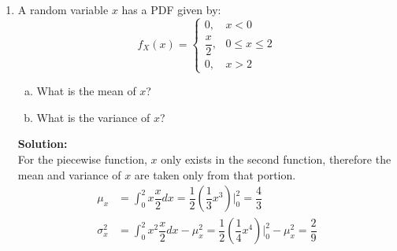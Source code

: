 \documentclass[11pt]{article}
\newcommand{\solution}{\textbf{Solution: \\}}
\begin{document}
\begin{enumerate}[label=\textbf{\arabic*.}]
  \item A random variable $x$ has a PDF given by:
  \[ f_X(x) = 
  \begin{cases}
    \mbox{$0$,           } & \mbox{} x<0 \\
    \mbox{$\dfrac{x}{2}$,} & \mbox{} 0 \leq x \leq 2 \\
    \mbox{$0$,           } & \mbox{} x>2
  \end{cases} \]
  \begin{enumerate}[(a)]
    \itemsep -2pt
    \item What is the mean of $x$?
    \item What is the variance of $x$?
  \end{enumerate}
  \solution
  For the piecewise function, $x$ only exists in the second function, therefore 
  the mean and variance of $x$ are taken only from that portion.
  \begin{equation*}
    \begin{split}
      \mu_x &= \int_{0}^{2} x\dfrac{x}{2}dx = \dfrac{1}{2}(\dfrac{1}{3}x^3)\biggr\rvert_0^2 = \dfrac{4}{3} \\
      \sigma_x^2 &= \int_{0}^{2} x^2\dfrac{x}{2}dx - \mu_x^2 = \dfrac{1}{2}(\dfrac{1}{4}x^4)\biggr\rvert_0^2 - \mu_x^2 = \dfrac{2}{9}
    \end{split}
  \end{equation*}


\end{enumerate}
\end{document}
